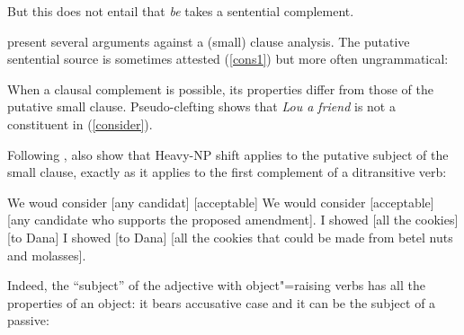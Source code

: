 \documentclass[output=paper
	        ,collection
	        ,collectionchapter
 	        ,biblatex
                ,babelshorthands
                ,newtxmath
                ,draftmode
                ,colorlinks, citecolor=brown
]{langscibook}
\begin{document}
But this does not entail that \emph{be} takes a sentential complement. 




\citet[Chapter~3]{PollardandSag1994} present several arguments against a (small) clause analysis. The putative sentential source is sometimes attested (\ref{cons1}) but more often ungrammatical:

	
\eal
{}
\zl

	
When a clausal complement is possible, its properties differ from those of the putative small clause. Pseudo-clefting shows that \textit{Lou a friend} is not a constituent in (\ref{consider}).

\eal
{}
\zl

Following \citet{Bresnan1982}, \citet[113]{PollardandSag1994} also show that Heavy-NP shift applies to the putative subject of the small clause, exactly as it applies to the first complement of a ditransitive verb:

\begin{exe}
\ex \begin{xlist}
\ex   We woud consider [any candidat] [acceptable]
\ex We would consider [acceptable]  [any candidate who supports the proposed amendment].
\ex   I showed [all the cookies] [to Dana]
\ex I showed [to Dana]  [all the cookies that could be made from betel nuts and molasses].  
\end{xlist}

\end{exe}

 Indeed, the ``subject'' of the adjective with object"=raising verbs has all the properties of an
 object: it bears accusative case and it can be the subject of a passive:
\end{document}
